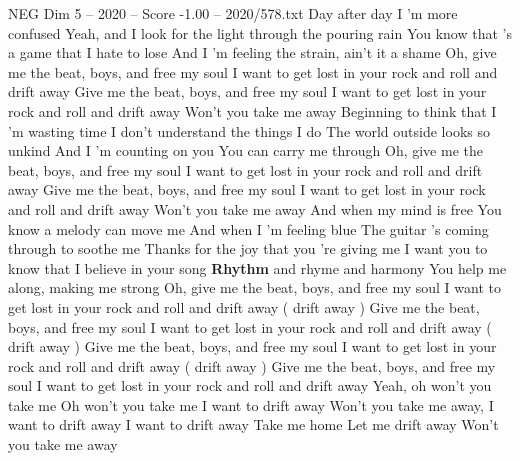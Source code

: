 \begin{textsample}{NEG Dim 5 – 2020 – Score -1.00 – 2020/578.txt}  \label{ex:f5_neg_023}
Day after day I 'm more confused Yeah, and I look for the light through the pouring rain You know that 's a game that I hate to lose And I 'm feeling the strain, ain't it a shame Oh, give me the beat, boys, and free my soul I want to get lost in your rock and roll and drift away Give me the beat, boys, and free my soul I want to get lost in your rock and roll and drift away Won't you take me away Beginning to think that I 'm wasting time I don't understand the things I do The world outside looks so unkind And I 'm counting on you You can carry me through Oh, give me the beat, boys, and free my soul I want to get lost in your rock and roll and drift away Give me the beat, boys, and free my soul I want to get lost in your rock and roll and drift away Won't you take me away And when my mind is free You know a melody can move me And when I 'm feeling blue The guitar 's coming through to soothe me Thanks for the joy that you 're giving me I want you to know that I believe in your song \textbf{Rhythm} and rhyme and harmony You help me along, making me strong Oh, give me the beat, boys, and free my soul I want to get lost in your rock and roll and drift away ( drift away ) Give me the beat, boys, and free my soul I want to get lost in your rock and roll and drift away ( drift away ) Give me the beat, boys, and free my soul I want to get lost in your rock and roll and drift away ( drift away ) Give me the beat, boys, and free my soul I want to get lost in your rock and roll and drift away Yeah, oh won't you take me Oh won't you take me I want to drift away Won't you take me away, I want to drift away I want to drift away Take me home Let me drift away Won't you take me away

\end{textsample}
